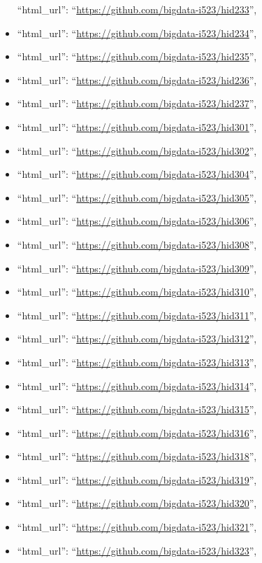 \begin{itemize}
  ``html\_url'': ``\url{https://github.com/bigdata-i523/hid233}'',
\item
  ``html\_url'': ``\url{https://github.com/bigdata-i523/hid234}'',
\item
  ``html\_url'': ``\url{https://github.com/bigdata-i523/hid235}'',
\item
  ``html\_url'': ``\url{https://github.com/bigdata-i523/hid236}'',
\item
  ``html\_url'': ``\url{https://github.com/bigdata-i523/hid237}'',
\item
  ``html\_url'': ``\url{https://github.com/bigdata-i523/hid301}'',
\item
  ``html\_url'': ``\url{https://github.com/bigdata-i523/hid302}'',
\item
  ``html\_url'': ``\url{https://github.com/bigdata-i523/hid304}'',
\item
  ``html\_url'': ``\url{https://github.com/bigdata-i523/hid305}'',
\item
  ``html\_url'': ``\url{https://github.com/bigdata-i523/hid306}'',
\item
  ``html\_url'': ``\url{https://github.com/bigdata-i523/hid308}'',
\item
  ``html\_url'': ``\url{https://github.com/bigdata-i523/hid309}'',
\item
  ``html\_url'': ``\url{https://github.com/bigdata-i523/hid310}'',
\item
  ``html\_url'': ``\url{https://github.com/bigdata-i523/hid311}'',
\item
  ``html\_url'': ``\url{https://github.com/bigdata-i523/hid312}'',
\item
  ``html\_url'': ``\url{https://github.com/bigdata-i523/hid313}'',
\item
  ``html\_url'': ``\url{https://github.com/bigdata-i523/hid314}'',
\item
  ``html\_url'': ``\url{https://github.com/bigdata-i523/hid315}'',
\item
  ``html\_url'': ``\url{https://github.com/bigdata-i523/hid316}'',
\item
  ``html\_url'': ``\url{https://github.com/bigdata-i523/hid318}'',
\item
  ``html\_url'': ``\url{https://github.com/bigdata-i523/hid319}'',
\item
  ``html\_url'': ``\url{https://github.com/bigdata-i523/hid320}'',
\item
  ``html\_url'': ``\url{https://github.com/bigdata-i523/hid321}'',
\item
  ``html\_url'': ``\url{https://github.com/bigdata-i523/hid323}'',

\end{itemize}
